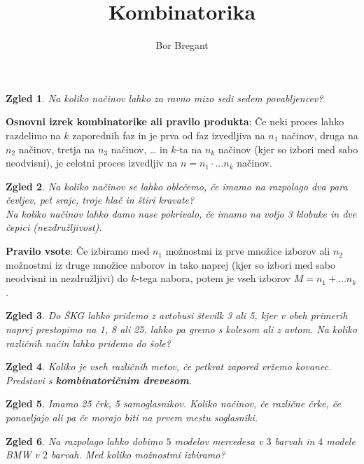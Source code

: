 \documentclass{article}
\title{Kombinatorika}
\author{Bor Bregant}
\date{\vspace{-5ex}}
\newtheorem*{zgled}{Zgled}
\begin{document}
\maketitle
\begin{zgled}
    Na koliko načinov lahko za ravno mizo sedi sedem povabljencev?
\end{zgled}

\textbf{Osnovni izrek kombinatorike ali pravilo produkta}: Če neki proces lahko razdelimo na $k$ zaporednih faz in je prva od faz izvedljiva na $n_1$ načinov, druga na $n_2$ načinov, tretja na $n_3$ načinov, … in $k$-ta na $n_k$ načinov (kjer so izbori med sabo neodvisni), je celotni proces izvedljiv na $n=n_1\cdot \ldots n_k$ načinov.

\begin{zgled}
    Na koliko načinov se lahko oblečemo, če imamo na razpolago dva para čevljev, pet srajc, troje hlač in štiri kravate?\\
    Na koliko načinov lahko damo nase pokrivalo, če imamo na voljo 3 klobuke in dve čepici (\textit{nezdružljivost}).
\end{zgled}


\textbf{Pravilo vsote}: Če izbiramo med $n_1$ možnostmi iz prve množice izborov ali $n_2$ možnostmi iz druge množice naborov in tako naprej (kjer so izbori med sabo neodvisni in nezdružljivi) do $k$-tega nabora, potem je vseh izborov $M=n_1 + \ldots n_k$.

\begin{zgled}
    Do ŠKG lahko pridemo z avtobusi številk 3 ali 5, kjer v obeh primerih naprej prestopimo na 1, 8 ali 25, lahko pa gremo s kolesom ali z avtom. Na koliko različnih način lahko pridemo do šole?
\end{zgled}

\begin{zgled}
    Koliko je vseh različnih metov, če petkrat zapored vržemo kovanec. Predstavi s \textbf{kombinatoričnim drevesom}.
\end{zgled}

\begin{zgled}
    Imamo 25 črk, 5 samoglasnikov. Koliko načinov, če različne črke, če ponavljajo ali pa če morajo biti na prvem mestu soglasniki.
\end{zgled}

\begin{zgled}
    Na razpolago lahko dobimo $5$ modelov mercedesa v $3$ barvah in $4$ modele BMW v $2$ barvah. Med koliko možnostmi izbiramo?
\end{zgled}
\end{document}
